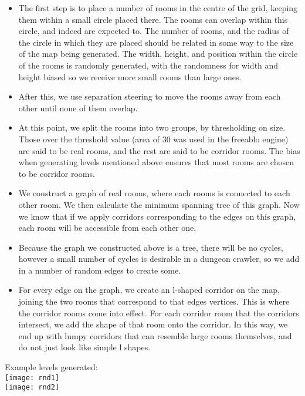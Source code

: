     \begin{itemize}
        \item
        {
            The first step is to place a number of rooms in the centre of the grid, keeping them within a small circle placed there.
            The rooms can overlap within this circle, and indeed are expected to. The number of rooms, and the radius of the circle in which they are placed
            should be related in some way to the size of the map being generated. The width, height, and position within the circle of the rooms is randomly generated, with the randomness for width and height biased so we receive more small rooms than large ones.    
        }
        \item
        {
            After this, we use separation steering to move the rooms away from each other until none of them overlap.
        }
        \item
        {
            At this point, we split the rooms into two groups, by thresholding on size. Those over the threshold value (area of 30 was used in the freeablo engine) are said to be real rooms, and the rest are said to be corridor rooms. The bias when generating levels mentioned above ensures that most rooms are chosen to be corridor rooms.
        }
        \item
        {
            We construct a graph of real rooms, where each rooms is connected to each other room. We then calculate the minimum spanning tree of this graph. Now we know that if we apply corridors corresponding to the edges on this graph, each room will be accessible from each other one.
        }
        \item
        {
            Because the graph we constructed above is a tree, there will be no cycles, however a small number of cycles is desirable in a dungeon crawler, so we add in a number of random edges to create some.
        }
        \item
        {
            For every edge on the graph, we create an l-shaped corridor on the map, joining the two rooms that correspond to that edges vertices.
            This is where the corridor rooms come into effect. For each corridor room that the corridors intersect, we add the shape of that room onto the corridor. In this way, we end up with lumpy corridors that can resemble large rooms themselves, and do not just look like simple l shapes.
        }
    \end{itemize}
    
    Example levels generated:\\ 
    \texttt{[image: rnd1]}\\   
    \texttt{[image: rnd2]}\\
    
